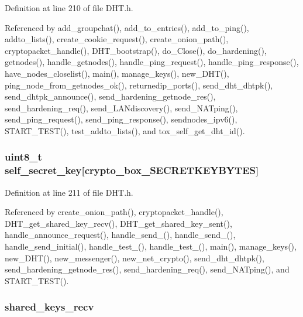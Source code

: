 Definition at line 210 of file D\+H\+T.\+h.



Referenced by add\+\_\+groupchat(), add\+\_\+to\+\_\+entries(), add\+\_\+to\+\_\+ping(), addto\+\_\+lists(), create\+\_\+cookie\+\_\+request(), create\+\_\+onion\+\_\+path(), cryptopacket\+\_\+handle(), D\+H\+T\+\_\+bootstrap(), do\+\_\+\+Close(), do\+\_\+hardening(), getnodes(), handle\+\_\+getnodes(), handle\+\_\+ping\+\_\+request(), handle\+\_\+ping\+\_\+response(), have\+\_\+nodes\+\_\+closelist(), main(), manage\+\_\+keys(), new\+\_\+\+D\+H\+T(), ping\+\_\+node\+\_\+from\+\_\+getnodes\+\_\+ok(), returnedip\+\_\+ports(), send\+\_\+dht\+\_\+dhtpk(), send\+\_\+dhtpk\+\_\+announce(), send\+\_\+hardening\+\_\+getnode\+\_\+res(), send\+\_\+hardening\+\_\+req(), send\+\_\+\+L\+A\+Ndiscovery(), send\+\_\+\+N\+A\+Tping(), send\+\_\+ping\+\_\+request(), send\+\_\+ping\+\_\+response(), sendnodes\+\_\+ipv6(), S\+T\+A\+R\+T\+\_\+\+T\+E\+S\+T(), test\+\_\+addto\+\_\+lists(), and tox\+\_\+self\+\_\+get\+\_\+dht\+\_\+id().

\hypertarget{struct_d_h_t_aa05050f86513ff53fe9da81f73c72267}{
\subsubsection[{self\+\_\+secret\+\_\+key}]{\setlength{\rightskip}{0pt plus 5cm}uint8\+\_\+t self\+\_\+secret\+\_\+key\mbox{[}crypto\+\_\+box\+\_\+\+S\+E\+C\+R\+E\+T\+K\+E\+Y\+B\+Y\+T\+E\+S\mbox{]}}}\label{struct_d_h_t_aa05050f86513ff53fe9da81f73c72267}


Definition at line 211 of file D\+H\+T.\+h.



Referenced by create\+\_\+onion\+\_\+path(), cryptopacket\+\_\+handle(), D\+H\+T\+\_\+get\+\_\+shared\+\_\+key\+\_\+recv(), D\+H\+T\+\_\+get\+\_\+shared\+\_\+key\+\_\+sent(), handle\+\_\+announce\+\_\+request(), handle\+\_\+send\+\_(), handle\+\_\+send\+\_(), handle\+\_\+send\+\_\+initial(), handle\+\_\+test\+\_(), handle\+\_\+test\+\_(), main(), manage\+\_\+keys(), new\+\_\+\+D\+H\+T(), new\+\_\+messenger(), new\+\_\+net\+\_\+crypto(), send\+\_\+dht\+\_\+dhtpk(), send\+\_\+hardening\+\_\+getnode\+\_\+res(), send\+\_\+hardening\+\_\+req(), send\+\_\+\+N\+A\+Tping(), and S\+T\+A\+R\+T\+\_\+\+T\+E\+S\+T().

\hypertarget{struct_d_h_t_a4c647e235c4b9d2d6d68d760c7cb1b30}{
\subsubsection[{shared\+\_\+keys\+\_\+recv}]{ shared\+\_\+keys\+\_\+recv}}\label{struct_d_h_t_a4c647e235c4b9d2d6d68d760c7cb1b30}


